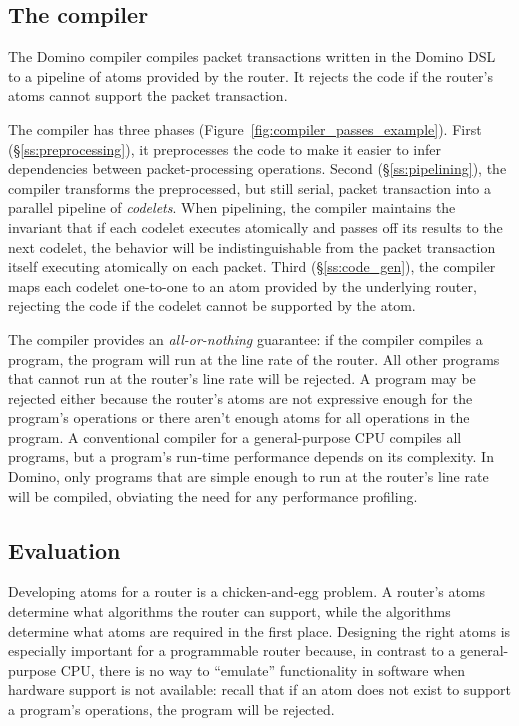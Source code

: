 \subsection{The compiler} The Domino compiler compiles packet transactions
written in the Domino DSL to a pipeline of atoms provided by the router. It
rejects the code if the router's atoms cannot support the packet transaction.

The compiler has three phases (Figure~\ref{fig:compiler_passes_example}). First
(\S\ref{ss:preprocessing}), it preprocesses the code to make it easier to infer
dependencies between packet-processing operations. Second
(\S\ref{ss:pipelining}), the compiler transforms the preprocessed, but still
serial, packet transaction into a parallel pipeline of {\em codelets}.  When
pipelining, the compiler maintains the invariant that if each codelet executes
atomically and passes off its results to the next codelet, the behavior will be
indistinguishable from the packet transaction itself executing atomically on
each packet. Third (\S\ref{ss:code_gen}), the compiler maps each codelet
one-to-one to an atom provided by the underlying router, rejecting the code if
the codelet cannot be supported by the atom.

The compiler provides an {\em all-or-nothing} guarantee: if the compiler
compiles a program, the program will run at the line rate of the router. All
other programs that cannot run at the router's line rate will be rejected. A
program may be rejected either because the router's atoms are not expressive
enough for the program's operations or there aren't enough atoms for all
operations in the program. A conventional compiler for a general-purpose CPU
compiles all programs, but a program's run-time performance depends on its
complexity. In Domino, only programs that are simple enough to run at the
router's line rate will be compiled, obviating the need for any performance
profiling.

\subsection{Evaluation}
Developing atoms for a router is a chicken-and-egg problem. A router's atoms
determine what algorithms the router can support, while the algorithms
determine what atoms are required in the first place. Designing the right atoms
is especially important for a programmable router because, in contrast to a
general-purpose CPU, there is no way to ``emulate'' functionality in software
when hardware support is not available: recall that if an atom does not exist
to support a program's operations, the program will be rejected.

